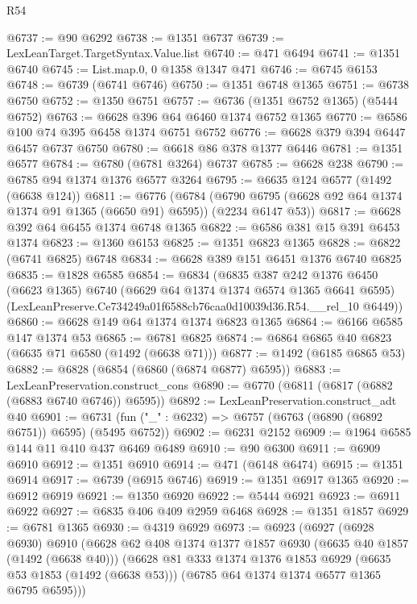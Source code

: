 \begin{lexlean}{R54}
\begin{coremodule}
@6737 := @90 @6292
@6738 := @1351 @6737
@6739 := LexLeanTarget.TargetSyntax.Value.list
@6740 := @471 @6494
@6741 := @1351 @6740
@6745 := List.map.{0, 0} @1358 @1347 @471
@6746 := @6745 @6153
@6748 := @6739 (@6741 @6746)
@6750 := @1351 @6748 @1365
@6751 := @6738 @6750
@6752 := @1350 @6751
@6757 := @6736 (@1351 @6752 @1365) (@5444 @6752)
@6763 := @6628 @396 @64 @6460 @1374 @6752 @1365
@6770 := @6586 @100 @74 @395 @6458 @1374 @6751 @6752
@6776 := @6628 @379 @394 @6447 @6457 @6737 @6750
@6780 := @6618 @86 @378 @1377 @6446
@6781 := @1351 @6577
@6784 := @6780 (@6781 @3264) @6737
@6785 := @6628 @238
@6790 := @6785 @94 @1374 @1376 @6577 @3264
@6795 := @6635 @124 @6577 (@1492 (@6638 @124))
@6811 := @6776
    (@6784 (@6790 @6795 (@6628 @92 @64 @1374 @1374 @91 @1365 (@6650 @91) @6595)) (@2234 @6147 @53))
@6817 := @6628 @392 @64 @6455 @1374 @6748 @1365
@6822 := @6586 @381 @15 @391 @6453 @1374
@6823 := @1360 @6153
@6825 := @1351 @6823 @1365
@6828 := @6822 (@6741 @6825) @6748
@6834 := @6628 @389 @151 @6451 @1376 @6740 @6825
@6835 := @1828 @6585
@6854 := @6834
    (@6835
      @387
      @242
      @1376
      @6450
      (@6623 @1365)
      @6740
      (@6629 @64 @1374 @1374 @6574 @1365 @6641 @6595)
      (LexLeanPreserve.Ce734249a01f6588cb76caa0d10039d36.R54.__rel_10 @6449))
@6860 := @6628 @149 @64 @1374 @1374 @6823 @1365
@6864 := @6166 @6585 @147 @1374 @53
@6865 := @6781 @6825
@6874 := @6864 @6865 @40 @6823 (@6635 @71 @6580 (@1492 (@6638 @71)))
@6877 := @1492 (@6185 @6865 @53)
@6882 := @6828 (@6854 (@6860 (@6874 @6877) @6595))
@6883 := LexLeanPreservation.construct_cons
@6890 := @6770 (@6811 (@6817 (@6882 (@6883 @6740 @6746)) @6595))
@6892 := LexLeanPreservation.construct_adt @40
@6901 := @6731 (fun ("_" : @6232) => @6757 (@6763 (@6890 (@6892 @6751)) @6595) (@5495 @6752))
@6902 := @6231 @2152
@6909 := @1964 @6585 @144 @11 @410 @437 @6469 @6489
@6910 := @90 @6300
@6911 := @6909 @6910
@6912 := @1351 @6910
@6914 := @471 (@6148 @6474)
@6915 := @1351 @6914
@6917 := @6739 (@6915 @6746)
@6919 := @1351 @6917 @1365
@6920 := @6912 @6919
@6921 := @1350 @6920
@6922 := @5444 @6921
@6923 := @6911 @6922
@6927 := @6835 @406 @409 @2959 @6468
@6928 := @1351 @1857
@6929 := @6781 @1365
@6930 := @4319 @6929
@6973 := @6923
    (@6927
      (@6928 @6930)
      @6910
      (@6628
        @62
        @408
        @1374
        @1377
        @1857
        @6930
        (@6635 @40 @1857 (@1492 (@6638 @40)))
        (@6628
          @81
          @333
          @1374
          @1376
          @1853
          @6929
          (@6635 @53 @1853 (@1492 (@6638 @53)))
          (@6785 @64 @1374 @1374 @6577 @1365 @6795 @6595)))

\end{coremodule}
\end{lexlean}

